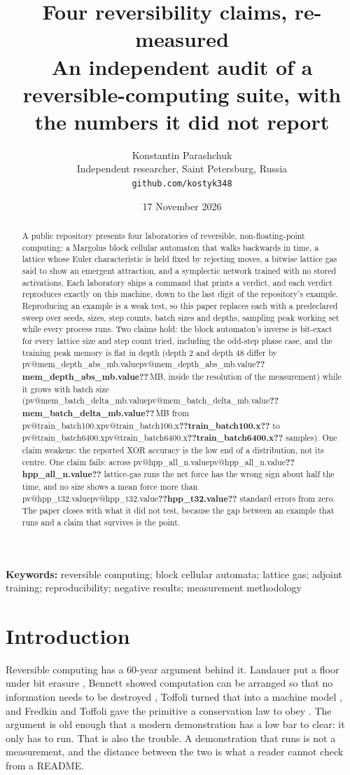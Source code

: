 \documentclass[11pt,a4paper]{article}
\title{\bfseries Four reversibility claims, re-measured\\[2pt]
\large An independent audit of a reversible-computing suite, with the numbers it did not report}
\author{Konstantin Parashchuk\\\small Independent researcher, Saint Petersburg, Russia\\
\small \texttt{github.com/kostyk348}}
\date{17 November 2026}
\makeatletter
\newcommand{\val}[1]{\ifcsname pv@#1\endcsname\csname pv@#1\endcsname\else\textbf{??#1??}\fi}
\makeatother
\begin{document}
\maketitle

\begin{abstract}
\noindent
A public repository presents four laboratories of reversible, non-floating-point computing: a
Margolus block cellular automaton that walks backwards in time, a lattice whose Euler
characteristic is held fixed by rejecting moves, a bitwise lattice gas said to show an emergent
attraction, and a symplectic network trained with no stored activations. Each laboratory ships a
command that prints a verdict, and each verdict reproduces exactly on this machine, down to the
last digit of the repository's example. Reproducing an example is a weak test, so this paper
replaces each with a predeclared sweep over seeds, sizes, step counts, batch sizes and depths,
sampling peak working set while every process runs. Two claims hold: the block automaton's
inverse is bit-exact for every lattice size and step count tried, including the odd-step phase
case, and the training peak memory is flat in depth (depth 2 and depth 48 differ by
\val{mem_depth_abs_mb.value}\,MB, inside the resolution of the measurement) while it grows with
batch size (\val{mem_batch_delta_mb.value}\,MB from \val{train_batch100.x} to
\val{train_batch6400.x} samples). One claim
weakens: the reported XOR accuracy is the low end of a distribution, not its centre. One claim
fails: across \val{hpp_all_n.value} lattice-gas runs the net force has the wrong sign about half
the time, and no size shows a mean force more than \val{hpp_t32.value} standard errors from
zero. The paper closes with what it did not test, because the gap between an example that runs
and a claim that survives is the point.
\end{abstract}

\noindent\textbf{Keywords:} reversible computing; block cellular automata; lattice gas; adjoint
training; reproducibility; negative results; measurement methodology

\section{Introduction}

Reversible computing has a 60-year argument behind it. Landauer put a floor under bit erasure
\citep{landauer1961}, Bennett showed computation can be arranged so that no information needs to
be destroyed \citep{bennett1973}, Toffoli turned that into a machine model \citep{toffoli1980},
and Fredkin and Toffoli gave the primitive a conservation law to obey \citep{fredkin1982}. The
argument is old enough that a modern demonstration has a low bar to clear: it only has to run.
That is also the trouble. A demonstration that runs is not a measurement, and the distance
between the two is what a reader cannot check from a README.
\end{document}
